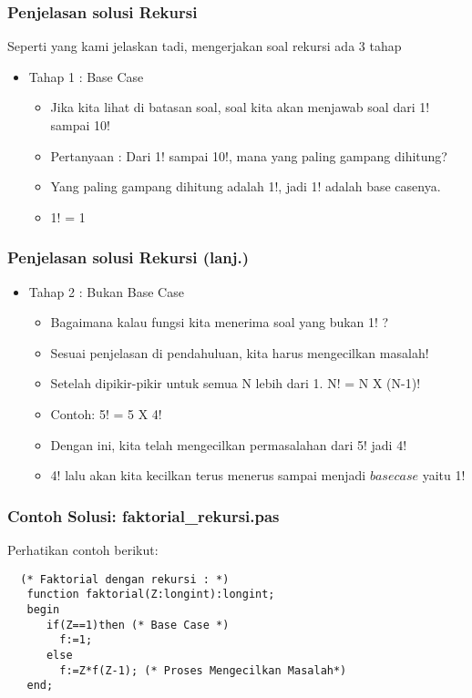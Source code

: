 \documentclass{beamer}
\begin{document}
\begin{frame}
\frametitle{Penjelasan solusi Rekursi}
Seperti yang kami jelaskan tadi, mengerjakan soal rekursi ada 3 tahap
\begin{itemize}
  \item Tahap 1 : Base Case
  \begin {itemize}
    \item Jika kita lihat di batasan soal, soal kita akan menjawab soal dari 1! sampai 10!
    \item Pertanyaan : Dari 1! sampai 10!, mana yang paling gampang dihitung?
    \item Yang paling gampang dihitung adalah 1!, jadi 1! adalah base casenya.
    \item 1! = 1
  \end {itemize}
\end{itemize}
\end{frame}

\begin{frame}
\frametitle{Penjelasan solusi Rekursi (lanj.) }
\begin{itemize}
  \item Tahap 2 : Bukan Base Case
  \begin {itemize}
    \item Bagaimana kalau fungsi kita menerima soal yang bukan 1! ?
    \item Sesuai penjelasan di pendahuluan, kita harus mengecilkan masalah!
    \item Setelah dipikir-pikir untuk semua N lebih dari 1. N! = N X (N-1)!
    \item Contoh: 5! = 5 X 4!
    \item Dengan ini, kita telah mengecilkan permasalahan dari 5! jadi 4!
    \item 4! lalu akan kita kecilkan terus menerus sampai menjadi $base case$ yaitu 1!
  \end {itemize}
\end{itemize}
\end{frame}

\begin{frame}[fragile]
\frametitle{Contoh Solusi: faktorial\_rekursi.pas}
Perhatikan contoh berikut:
\begin{lstlisting}
  (* Faktorial dengan rekursi : *)
   function faktorial(Z:longint):longint;
   begin
      if(Z==1)then (* Base Case *)
        f:=1;
      else
        f:=Z*f(Z-1); (* Proses Mengecilkan Masalah*)
   end;
\end{lstlisting}
\end{frame}
\end{document}
